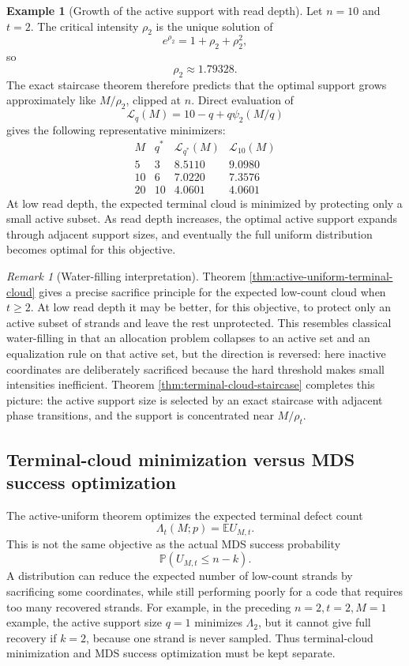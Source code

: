 \documentclass[11pt]{article}
\theoremstyle{definition}
\newtheorem{example}{Example}
\theoremstyle{remark}
\newtheorem{remark}{Remark}
\newcommand{\E}{\mathbb E}
\newcommand{\Pbb}{\mathbb P}
\newcommand{\1}{\mathbf 1}
\begin{document}
\begin{example}[Growth of the active support with read depth]
Let \(n=10\) and \(t=2\).  The critical intensity \(\rho_2\) is the unique solution of
\[
  e^{\rho_2}=1+\rho_2+\rho_2^2,
\]
so
\[
  \rho_2\approx1.79328.
\]
The exact staircase theorem therefore predicts that the optimal support grows approximately like \(M/\rho_2\), clipped at \(n\).  Direct evaluation of
\[
  \mathcal L_q(M)=10-q+q\psi_2(M/q)
\]
gives the following representative minimizers:
\[
\begin{array}{c|c|c|c}
M & q^* & \mathcal L_{q^*}(M) & \mathcal L_{10}(M)\\
\hline
5  & 3  & 8.5110 & 9.0980\\
10 & 6  & 7.0220 & 7.3576\\
20 & 10 & 4.0601 & 4.0601
\end{array}
\]
At low read depth, the expected terminal cloud is minimized by protecting only a small active subset.  As read depth increases, the optimal active support expands through adjacent support sizes, and eventually the full uniform distribution becomes optimal for this objective.
\end{example}

\begin{remark}[Water-filling interpretation]
Theorem \ref{thm:active-uniform-terminal-cloud} gives a precise sacrifice principle for the expected low-count cloud when \(t\ge2\).  At low read depth it may be better, for this objective, to protect only an active subset of strands and leave the rest unprotected.  This resembles classical water-filling in that an allocation problem collapses to an active set and an equalization rule on that active set, but the direction is reversed: here inactive coordinates are deliberately sacrificed because the hard threshold makes small intensities inefficient.  Theorem \ref{thm:terminal-cloud-staircase} completes this picture: the active support size is selected by an exact staircase with adjacent phase transitions, and the support is concentrated near \(M/\rho_t\).
\end{remark}

\subsection{Terminal-cloud minimization versus MDS success optimization}

The active-uniform theorem optimizes the expected terminal defect count
\[
  \Lambda_t(M;p)=\E U_{M,t}.
\]
This is not the same objective as the actual MDS success probability
\[
  \Pbb(U_{M,t}\le n-k).
\]
A distribution can reduce the expected number of low-count strands by sacrificing some coordinates, while still performing poorly for a code that requires too many recovered strands.  For example, in the preceding \(n=2,t=2,M=1\) example, the active support size \(q=1\) minimizes \(\Lambda_2\), but it cannot give full recovery if \(k=2\), because one strand is never sampled.  Thus terminal-cloud minimization and MDS success optimization must be kept separate.
\end{document}
